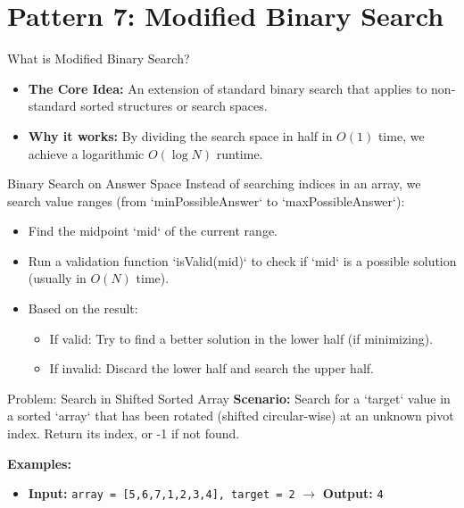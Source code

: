 \section{Pattern 7: Modified Binary Search}

\begin{frame}[c]{\empty}
    \begin{center}
        \Large\textbf{\secname}
    \end{center}
\end{frame}

\begin{frame}{What is Modified Binary Search?}
  \begin{itemize}
    \item \textbf{The Core Idea:} An extension of standard binary search that applies to non-standard sorted structures or search spaces.
    \item \textbf{Why it works:} By dividing the search space in half in $O(1)$ time, we achieve a logarithmic $O(\log N)$ runtime.
  \end{itemize}
\end{frame}

\begin{frame}{Binary Search on Answer Space}
  Instead of searching indices in an array, we search value ranges (from `minPossibleAnswer` to `maxPossibleAnswer`):
  \begin{itemize}
    \item Find the midpoint `mid` of the current range.
    \item Run a validation function `isValid(mid)` to check if `mid` is a possible solution (usually in $O(N)$ time).
    \item Based on the result:
      \begin{itemize}
        \item If valid: Try to find a better solution in the lower half (if minimizing).
        \item If invalid: Discard the lower half and search the upper half.
      \end{itemize}
  \end{itemize}
\end{frame}

\begin{frame}[fragile]{Problem: Search in Shifted Sorted Array}
  \textbf{Scenario:}
  Search for a `target` value in a sorted `array` that has been rotated (shifted circular-wise) at an unknown pivot index. Return its index, or -1 if not found.
  
  \vspace{0.3cm}
  \textbf{Examples:}
  \begin{itemize}
    \item \textbf{Input:} \texttt{array = [5,6,7,1,2,3,4], target = 2} $\rightarrow$ \textbf{Output:} \texttt{4}
  \end{itemize}
\end{frame}

